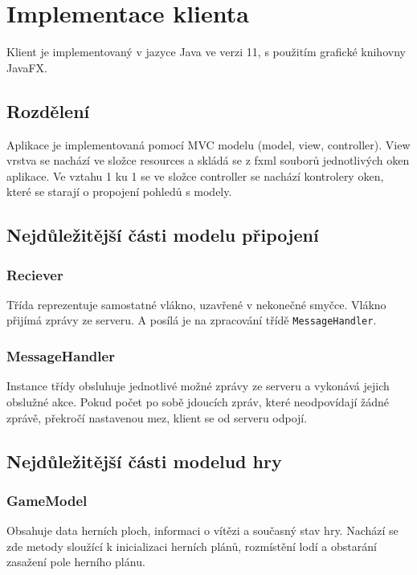 \documentclass[12pt, a4paper]{article} %
\begin{document}
	\section{Implementace klienta}
	\par Klient je implementovaný v jazyce Java ve verzi 11, s použitím grafické knihovny JavaFX.
	\subsection{Rozdělení}
	\par Aplikace je implementovaná pomocí MVC modelu (model, view, controller). 
	View vrstva se nachází ve složce resources a skládá se z fxml souborů jednotlivých oken aplikace. Ve vztahu 1 ku 1  se ve složce controller se nachází kontrolery oken, které se starají o propojení pohledů s modely.\\
	
	\subsection{Nejdůležitější části modelu připojení}	
	\subsubsection{Reciever}
	\par Třída reprezentuje samostatné vlákno, uzavřené v nekonečné smyčce. Vlákno přijímá zprávy ze serveru. A posílá je na zpracování třídě \texttt{MessageHandler}.
	
	\subsubsection{MessageHandler}
	\par Instance třídy obsluhuje jednotlivé možné zprávy ze serveru a vykonává jejich obslužné akce. Pokud počet po sobě jdoucích zpráv, které neodpovídají žádné zprávě, překročí nastavenou mez, klient se od serveru odpojí.
	
	
	\subsection{Nejdůležitější části modelud hry}
	\subsubsection{GameModel}
	\par Obsahuje data herních ploch, informaci o vítězi a současný stav hry. Nachází se zde metody sloužící k inicializaci herních plánů, rozmístění lodí a obstarání  zasažení pole herního plánu.
	
\end{document}
